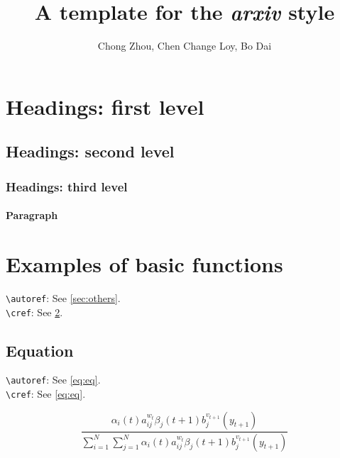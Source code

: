 \documentclass[onecolumn]{article}
\title{A template for the \emph{arxiv} style}
\author{%
  Chong Zhou\affmark{\footlabel{1}1,2},
  Chen Change Loy\affmark{1},
  Bo Dai\affmark{2}
}
\theoremstyle{definition}
\theoremstyle{remark}
\begin{document}
\maketitle

\begin{abstract}
	\lipsum[1]
\end{abstract}




\section{Headings: first level}

\lipsum[2]

\subsection{Headings: second level}
\lipsum[3]

\subsubsection{Headings: third level}
\lipsum[4]

\paragraph{Paragraph}
\lipsum[5]



\section{Examples of basic functions}
\label{sec:others}

\verb+\autoref+: See \autoref{sec:others}. \\
\verb+\cref+: See \cref{sec:others}. 

\subsection{Equation}

\verb+\autoref+: See \autoref{eq:eq}. \\
\verb+\cref+: See \cref{eq:eq}. 

\begin{equation}
{\frac {\alpha _{i}(t)a^{w_t}_{ij}\beta _{j}(t+1)b^{v_{t+1}}_{j}(y_{t+1})}{\sum _{i=1}^{N} \sum _{j=1}^{N} \alpha _{i}(t)a^{w_t}_{ij}\beta _{j}(t+1)b^{v_{t+1}}_{j}(y_{t+1})}}
    \label{eq:eq}
\end{equation}
\end{document}
